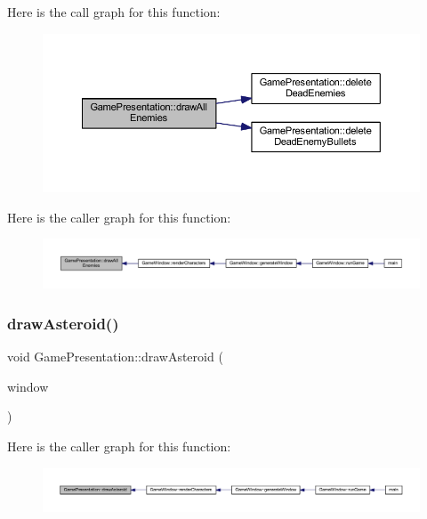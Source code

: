 Here is the call graph for this function\+:\nopagebreak
\begin{figure}[H]
\begin{center}
\leavevmode
\includegraphics[width=350pt]{class_game_presentation_af29e04c4a89f0a6d1ca9eab33da5ace5_cgraph}
\end{center}
\end{figure}
Here is the caller graph for this function\+:\nopagebreak
\begin{figure}[H]
\begin{center}
\leavevmode
\includegraphics[width=350pt]{class_game_presentation_af29e04c4a89f0a6d1ca9eab33da5ace5_icgraph}
\end{center}
\end{figure}
\mbox{\label{class_game_presentation_adbeb1c114932cdab67120bd6fe6a5da5}} 
\subsubsection{\texorpdfstring{draw\+Asteroid()}{drawAsteroid()}}
{\footnotesize\ttfamily void Game\+Presentation\+::draw\+Asteroid (\begin{DoxyParamCaption}\item[{Render\+Window \&}]{window }\end{DoxyParamCaption})}

Here is the caller graph for this function\+:\nopagebreak
\begin{figure}[H]
\begin{center}
\leavevmode
\includegraphics[width=350pt]{class_game_presentation_adbeb1c114932cdab67120bd6fe6a5da5_icgraph}
\end{center}
\end{figure}
\mbox{\label{class_game_presentation_a8c0ec310f4105564f11d1b48779e3941}} 
